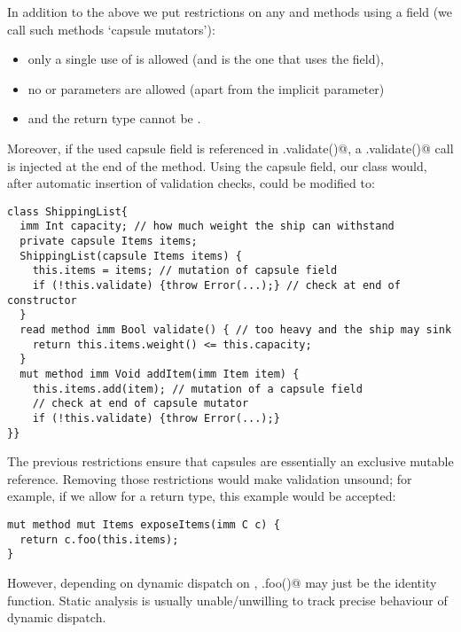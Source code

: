 In addition to the above we put restrictions on any \Q@mut@ and \Q@capsule@ methods using a \Q@capsule@ field (we call such methods `capsule mutators'):
\begin{itemize}
\item only a single use of \Q@this@ is allowed (and is the one that uses the field),
\item no \Q@mut@ or \Q@read@ parameters are allowed (apart from the implicit \Q@this@ parameter)
\item and the return type cannot be \Q@mut@.
\end{itemize}
\noindent  Moreover, if the used capsule field is referenced in \Q@.validate()@, a \Q@this.validate()@ call is injected at the end of the method.
Using the capsule field, our \Q@ShippingList@ class would, after automatic insertion of validation checks, could be modified to:
\saveSpace
\begin{lstlisting}
class ShippingList{
  imm Int capacity; // how much weight the ship can withstand
  private capsule Items items;
  ShippingList(capsule Items items) {
    this.items = items; // mutation of capsule field
    if (!this.validate) {throw Error(...);} // check at end of constructor
  }
  read method imm Bool validate() {	// too heavy and the ship may sink
    return this.items.weight() <= this.capacity;
  }
  mut method imm Void addItem(imm Item item) {
    this.items.add(item); // mutation of a capsule field
    // check at end of capsule mutator
    if (!this.validate) {throw Error(...);}
}}
\end{lstlisting}
\saveSpace

\noindent The previous restrictions ensure that capsules are essentially an exclusive mutable reference.
Removing those restrictions would make validation unsound; for example, if we allow for a \Q@mut@ return type, this example would be accepted:

\saveSpace
\begin{lstlisting}
mut method mut Items exposeItems(imm C c) {
  return c.foo(this.items);
}
\end{lstlisting}
\saveSpace
\noindent However, depending on dynamic dispatch on \Q@c@, \Q@c.foo()@ may just be the identity function.
Static analysis is usually unable/unwilling to track precise behaviour of dynamic dispatch.

